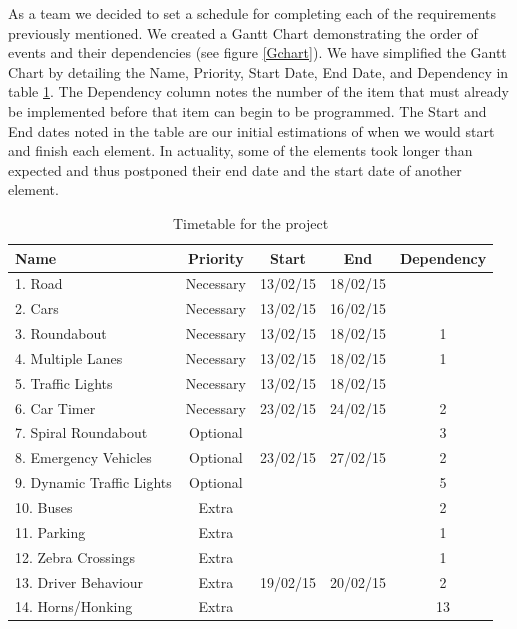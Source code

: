 \documentclass{article}
\begin{document}
	As a team we decided to set a schedule for completing each of the requirements previously mentioned. We created a Gantt Chart demonstrating the order of events and their dependencies (see figure \ref{Gchart}). We have simplified the Gantt Chart by detailing the Name, Priority, Start Date, End Date, and Dependency in table \ref{timetable}. The Dependency column notes the number of the item that must already be implemented before that item can begin to be programmed. The Start and End dates noted in the table are our initial estimations of when we would start and finish each element. In actuality, some of the elements took longer than expected and thus postponed their end date and the start date of another element.
    
	\begin{table}[H]
		\centering
		\label{TimetableForTheProject}
		\begin{tabular}{|l|c|c|c|c|}
			\hline {\bf Name} & {\bf Priority} & {\bf Start} & {\bf End} & {\bf Dependency} \\ 
			\hline 1. Road & Necessary & 13/02/15 &  18/02/15 &  \\ 
			\hline 2. Cars & Necessary & 13/02/15 &  16/02/15 &  \\ 
			\hline 3. Roundabout & Necessary & 13/02/15 & 18/02/15 & 1 \\ 
			\hline 4. Multiple Lanes & Necessary & 13/02/15 & 18/02/15 & 1 \\ 
			\hline 5. Traffic Lights & Necessary & 13/02/15 & 18/02/15 &  \\ 
			\hline 6.  Car Timer & Necessary & 23/02/15  & 24/02/15 & 2 \\ 
			\hline 7. Spiral Roundabout & Optional &  &  & 3 \\ 
			\hline 8. Emergency Vehicles & Optional & 23/02/15 & 27/02/15 & 2 \\ 			\hline 9. Dynamic Traffic Lights & Optional &  &  & 5 \\ 
			\hline 10. Buses& Extra &  &  & 2 \\ 
			\hline  11. Parking & Extra &  &  & 1 \\ 
			\hline  12. Zebra Crossings & Extra &  &  & 1 \\ 
			\hline 13. Driver Behaviour & Extra &  19/02/15 & 20/02/15 & 2 \\ 
			\hline 14. Horns/Honking & Extra &  &  & 13 \\ 
			\hline 
		\end{tabular} 
		\caption{Timetable for the project}
        \label{timetable}
	\end{table}
	
\end{document}
